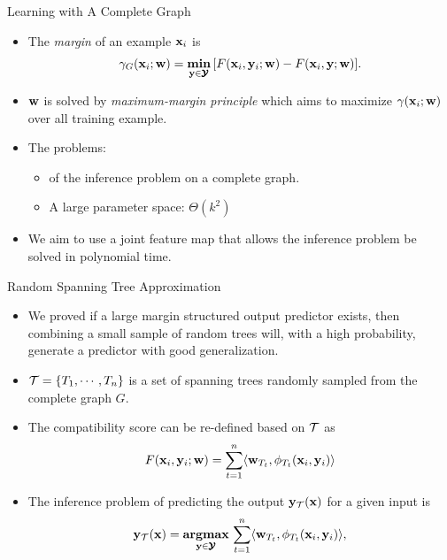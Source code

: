\documentclass[first=dgreen,second=purple,logo=yellowexc]{aaltoslides}
\begin{document}
%
\begin{frame}{Learning with A Complete Graph}
	\begin{itemize}
		\item The \textit{margin} of an example $\mathbf {x}_i$ is
		\begin{align*}
			\gamma_G(\mathbf {x}_i;\mathbf {w}) = \underset{\mathbf {y}\in\pmb {\mathcal{Y}}}{\textbf{min}}\,[F(\mathbf {x}_i,\mathbf {y}_i;\mathbf {w})-F(\mathbf {x}_i,\mathbf {y};\mathbf {w})].
		\end{align*}
		\item $\mathbf {w}$ is solved by \textit{maximum-margin principle} which aims to maximize $\gamma(\mathbf {x}_i;\mathbf {w})$ over all training example.
		\item The problems:
		\begin{itemize}
			\item \nphardness of the inference problem on a complete graph.
			\item A large parameter space: $\Theta(k^2)$
		\end{itemize}
		\item We aim to use a joint feature map that allows the inference problem be solved in polynomial time.
	\end{itemize}
\end{frame}



%
\begin{frame}{Random Spanning Tree Approximation}
	\begin{itemize}
		\item We proved if a large margin structured output predictor exists, then combining a small sample of random trees will, with a high probability, generate a predictor with good generalization.
		\item $\mathcal{T}=\{T_1,\cdots,T_n\}$ is a set of spanning trees randomly sampled from the complete graph $G$.
		\item The compatibility score can be re-defined based on $\mathcal{T}$ as
		\begin{align*}
			F(\mathbf {x}_i,\mathbf {y}_i;\mathbf {w}) = \sum_{t=1}^{n}\langle \mathbf {w}_{T_t}, \phi_{T_t}(\mathbf {x}_i,\mathbf {y}_i) \rangle
		\end{align*}
		\item The inference problem of predicting the output $\mathbf {y}_{\mathcal{T}}(\mathbf {x})$ for a given input is 
		\begin{align*}
			\mathbf {y}_{\mathcal{T}}(\mathbf {x}) = \underset{\mathbf {y}\in\pmb {\mathcal{Y}}}{\textbf{argmax}}\,\sum_{t=1}^{n}\langle \mathbf {w}_{T_t}, \phi_{T_t}(\mathbf {x}_i,\mathbf {y}_i) \rangle,
		\end{align*}
	\end{itemize}
\end{frame}
\end{document}
